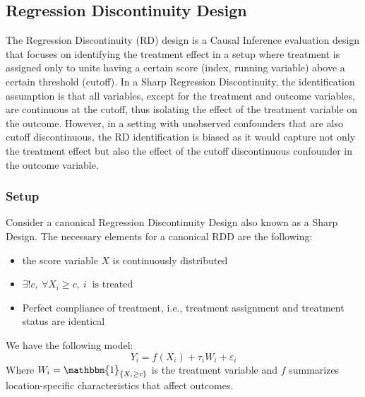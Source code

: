 \documentclass[12pt]{article}
\theoremstyle{plain}
\theoremstyle{remark}
\begin{document}
\subsection{Regression Discontinuity Design}

The Regression Discontinuity (RD) design is a Causal Inference evaluation design that focuses on identifying the treatment effect in a setup where treatment is assigned only to units having a certain score (index, running variable) above a certain threshold (cutoff). In a Sharp Regression Discontinuity, the identification assumption is that all variables, except for the treatment and outcome variables, are continuous at the cutoff, thus isolating the effect of the treatment variable on the outcome. However, in a setting with unobserved confounders that are also cutoff discontinuous, the RD identification is biased as it would capture not only the treatment effect but also the effect of the cutoff discontinuous confounder in the outcome variable. 

\subsubsection{Setup}
Consider a canonical Regression Discontinuity Design also known as a Sharp Design. The necessary elements for a canonical RDD are the following: 

        \begin{itemize}
            \item the score variable $X$ is continuously distributed
            \item $ \exists ! c ,\ \forall X_i\geq c,\ i\ \text{ is treated}$
            \item Perfect compliance of treatment, i.e., treatment assignment and treatment status are identical
        \end{itemize}

 We have the following model: 
        \begin{equation}
            Y_{i}=f(X_i) + \tau_i W_i + \varepsilon_{i}
        \end{equation}
Where $W_{i}=\mathbbm{1}_{\{X_i \geq c\}}$ is the treatment variable and $f$ summarizes location-specific characteristics that affect outcomes.
\end{document}
